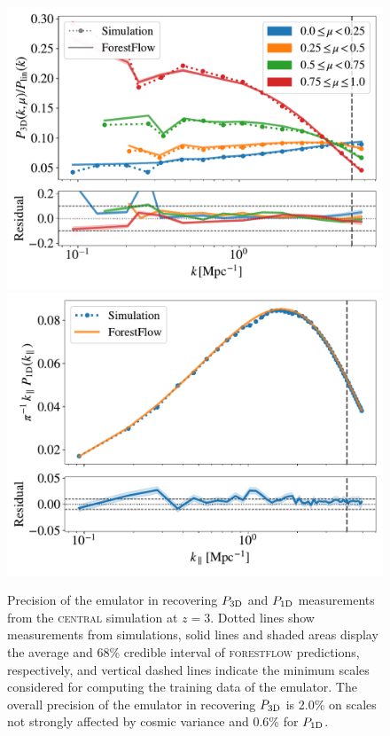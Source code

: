 \documentclass[fleqn,usenatbib]{mnras}
\newcommand{\poned}{\ensuremath{P_{\rm 1D}}\xspace}
\newcommand{\pthreed}{\ensuremath{P_{\rm 3D}}\xspace}
\newcommand{\forestflow}{\textsc{forestflow}\xspace}
\newcommand{\simcentral}{\textsc{central}\xspace}
\begin{document}
\begin{figure}
\includegraphics[width= 0.95\columnwidth]{figures/p3d_snap.pdf}
\includegraphics[width= 0.97\columnwidth]{figures/p1d_snap.pdf}
\centering
\caption{Precision of the emulator in recovering \pthreed and \poned measurements from the \simcentral simulation at $z=3$. Dotted lines show measurements from simulations, solid lines and shaded areas display the average and 68\% credible interval of \forestflow predictions, respectively, and vertical dashed lines indicate the minimum scales considered for computing the training data of the emulator. The overall precision of the emulator in recovering \pthreed is 2.0\% on scales not strongly affected by cosmic variance and 0.6\% for \poned.
}
\label{fig:test_snap}
\end{figure}
\end{document}
